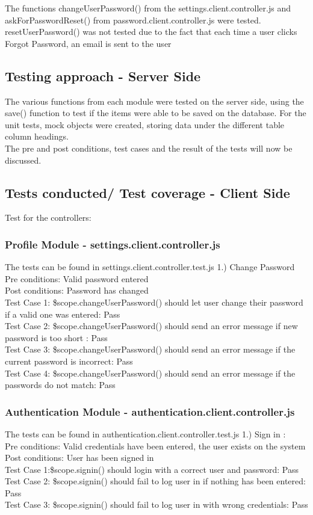 \documentclass[a4paper,12pt]{report}
\begin{document}
The functions changeUserPassword() from the settings.client.controller.js and askForPasswordReset() from password.client.controller.js were tested. resetUserPassword() was not tested due to the fact that each time a user clicks Forgot Password, an email is sent to the user 
 
\subsection{Testing approach - Server Side}
The various functions from each module were tested on the server side, using the save() function to test if the items were able to be saved on the database. For the unit tests, mock objects were created, storing data under the different table column headings.
\\
The pre and post conditions, test cases and the result of the tests will now be discussed.

\subsection{Tests conducted/ Test coverage - Client Side}
Test for the controllers: 

\subsubsection{Profile Module - settings.client.controller.js}
The tests can be found in settings.client.controller.test.js
1.) Change Password
Pre conditions: Valid password entered
\\Post conditions: Password has changed
\\ Test Case 1: \$scope.changeUserPassword() should let user change their password if a valid one was entered: Pass
\\ Test Case 2: \$scope.changeUserPassword() should send an error message if new password is too short : Pass
\\ Test Case 3: \$scope.changeUserPassword()  should send an error message if the current password is incorrect: Pass
\\ Test Case 4: \$scope.changeUserPassword() should send an error message if the passwords do not match: Pass
 
\subsubsection{Authentication Module - authentication.client.controller.js }
The tests can be found in authentication.client.controller.test.js
1.) Sign in : \\
Pre conditions: Valid credentials have been entered, the user exists on the system
\\ Post conditions: User has been signed in
\\  Test Case 1:\$scope.signin() should login with a correct user and password: Pass
\\ Test Case 2: \$scope.signin() should fail to log user in if nothing has been entered: Pass
\\ Test Case 3: \$scope.signin()  should fail to log user in with wrong credentials: Pass
\end{document}

